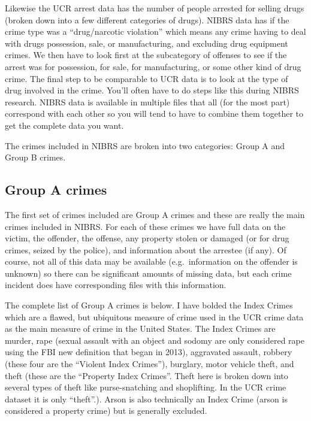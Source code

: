 \documentclass[
]{krantz}
\begin{document}
Likewise the UCR arrest data has the number of people
arrested for selling drugs (broken down into a few different
categories of drugs). NIBRS data has if the crime type was a
``drug/narcotic violation'' which means any crime having to
deal with drugs possession, sale, or manufacturing, and
excluding drug equipment crimes. We then have to look first
at the subcategory of offenses to see if the arrest was for
possession, for sale, for manufacturing, or some other kind
of drug crime. The final step to be comparable to UCR data
is to look at the type of drug involved in the crime. You'll
often have to do steps like this during NIBRS research.
NIBRS data is available in multiple files that all (for the
most part) correspond with each other so you will tend to
have to combine them together to get the complete data you
want.

The crimes included in NIBRS are broken into two categories:
Group A and Group B crimes.

\subsection{Group A crimes}\label{group-a-crimes}

The first set of crimes included are Group A crimes and
these are really the main crimes included in NIBRS. For each
of these crimes we have full data on the victim, the
offender, the offense, any property stolen or damaged (or
for drug crimes, seized by the police), and information
about the arrestee (if any). Of course, not all of this data
may be available (e.g.~information on the offender is
unknown) so there can be significant amounts of missing
data, but each crime incident does have corresponding files
with this information.

The complete list of Group A crimes is below. I have bolded
the Index Crimes which are a flawed, but ubiquitous measure
of crime used in the UCR crime data as the main measure of
crime in the United States. The Index Crimes are murder,
rape (sexual assault with an object and sodomy are only
considered rape using the FBI new definition that began in
2013), aggravated assault, robbery (these four are the
``Violent Index Crimes''), burglary, motor vehicle theft,
and theft (these are the ``Property Index Crimes''. Theft
here is broken down into several types of theft like
purse-snatching and shoplifting. In the UCR crime dataset it
is only ``theft''.). Arson is also technically an Index
Crime (arson is considered a property crime) but is
generally excluded.
\end{document}
